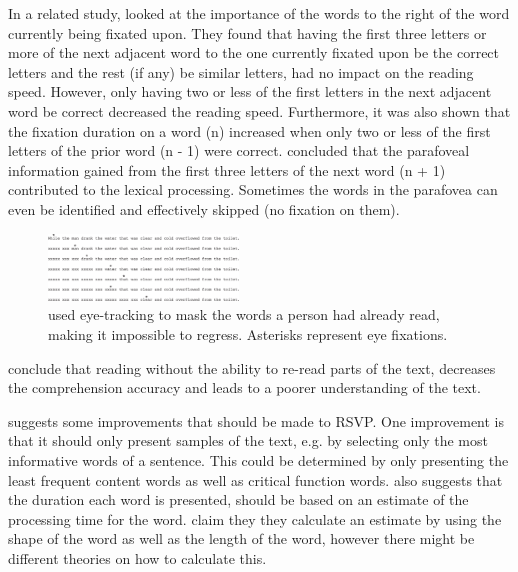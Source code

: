 In a related study,  looked at the importance of the words to the right of the word currently being fixated upon. They found that having the first three letters or more of the next adjacent word to the one currently fixated upon be the correct letters and the rest (if any) be similar letters, had no impact on the reading speed. However, only having two or less of the first letters in the next adjacent word be correct decreased the reading speed. Furthermore, it was also shown that the fixation duration on a word (n) increased when only two or less of the first letters of the prior word (n - 1) were correct. \citeauthor{eyeMovement} concluded that the parafoveal information gained from the first three letters of the next word (n + 1) contributed to the lexical processing. Sometimes the words in the parafovea can even be identified and effectively skipped (no fixation on them).

\begin{figure}[htbp]
\centering
\includegraphics[width=0.45\textwidth]{Pics/trace_crosses}
\caption{\protect\citeauthor{schotter_dont_2014} used eye-tracking to mask the words a person had already read, making it impossible to regress. Asterisks represent eye fixations. \protect\cite{schotter_dont_2014}}
\label{fig:trace_cross}
\end{figure}

\citeauthor{schotter_dont_2014} conclude that reading without the ability to re-read parts of the text, decreases the comprehension accuracy and leads to a poorer understanding of the text.


 suggests some improvements that should be made to RSVP. One improvement is that it should only present samples of the text, e.g. by selecting only the most informative words of a sentence. This could be determined by only presenting the least frequent content words as well as critical function words.  also suggests that the duration each word is presented, should be based on an estimate of the processing time for the word.  claim they they calculate an estimate by using the shape of the word as well as the length of the word, however there might be different theories on how to calculate this.

